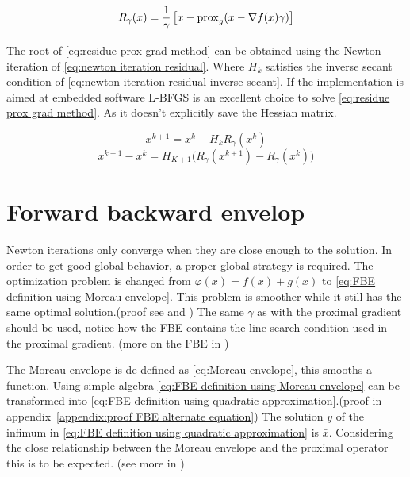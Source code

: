 			\begin{equation}
			R_{\gamma}(x)= \frac{1}{\gamma}\left[ x - \operatorname{prox}_g( x - \nabla f(x)\gamma) \right]
			\label{eq:residue prox grad method}
			\end{equation}
			
			The root of \eqref{eq:residue prox grad method} can be obtained using the Newton iteration of \eqref{eq:newton iteration residual}. Where $H_k$ satisfies the inverse secant condition of \eqref{eq:newton iteration residual inverse secant}. If the implementation is aimed at embedded software L-BFGS is an excellent choice to solve \eqref{eq:residue prox grad method}. As it doesn't explicitly save the Hessian matrix.
			
			\begin{equation}
			x^{k+1} = x^k -H_kR_{\gamma}(x^k)
			\label{eq:newton iteration residual}
			\end{equation}
			\begin{equation}
			x^{k+1} - x^k = H_{K+1} \Big( R_{\gamma}(x^{k+1})- R_{\gamma}(x^k) \Big)
			\label{eq:newton iteration residual inverse secant}
			\end{equation}
		
	\section{Forward backward envelop}	
		Newton iterations only converge when they are close enough to the solution. In order to get good global behavior, a proper global strategy is required. The optimization problem is changed from $\varphi(x) = f(x) + g(x)$ to \eqref{eq:FBE definition using Moreau envelope}. This problem is smoother while it still has the same optimal solution.(proof see \cite{LorenzoStella2017} and \cite{Themelis}) The same $\gamma$ as with the proximal gradient should be used, notice how the FBE contains the line-search condition used in the proximal gradient. (more on the FBE in \cite{Themelis})
		
		The Moreau envelope is de defined as \eqref{eq:Moreau envelope}, this smooths a function. Using simple algebra \eqref{eq:FBE definition using Moreau envelope} can be transformed into \eqref{eq:FBE definition using quadratic approximation}.(proof in appendix~\ref{appendix:proof FBE alternate equation}) The solution $y$ of the infimum in \eqref{eq:FBE definition using quadratic approximation} is $\bar{x}$. Considering the close relationship between the Moreau envelope and the proximal operator this is to be expected. (see more in \cite{Themelis}) 
		
